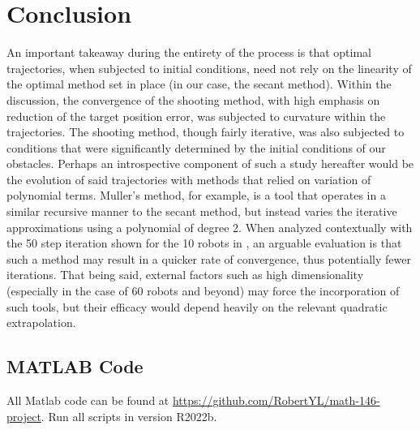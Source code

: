 \documentclass[11pt]{article}
\begin{document}
\section{Conclusion}

An important takeaway during the entirety of the process is that optimal trajectories, when subjected to initial conditions, need not rely on the linearity of the optimal method set in place (in our case, the secant method). Within the discussion, the convergence of the shooting method, with high emphasis on reduction of the target position error, was subjected to curvature within the trajectories. The shooting method, though fairly iterative, was also subjected to conditions that were significantly determined by the initial conditions of our obstacles. Perhaps an introspective component of such a study hereafter would be the evolution of said trajectories with methods that relied on variation of polynomial terms. Muller's method, for example, is a tool that operates in a similar recursive manner to the secant method, but instead varies the iterative approximations using a polynomial of degree 2. When analyzed contextually with the 50 step iteration shown for the 10 robots in , an arguable evaluation is that such a method may result in a quicker rate of convergence, thus potentially fewer iterations. That being said, external factors such as high dimensionality (especially in the case of 60 robots and beyond) may force the incorporation of such tools, but their efficacy would depend heavily on the relevant quadratic extrapolation.

\begin{appendices}

\section{MATLAB Code}

All Matlab code can be found at \url{https://github.com/RobertYL/math-146-project}. Run all scripts in version R2022b.

\end{appendices}
\end{document}
